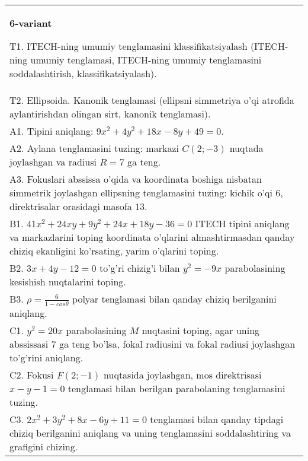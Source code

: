 \documentclass{article}
\begin{document}
\begin{tabular}{m{17cm}}
\textbf{6-variant}
\newline

T1. ITECH-ning umumiy tenglamasini klassifikatsiyalash (ITECH-ning umumiy tenglamasi, ITECH-ning umumiy tenglamasini soddalashtirish, klassifikatsiyalash).\\

T2. Ellipsoida. Kanonik tenglamasi (ellipsni simmetriya o'qi atrofida aylantirishdan olingan sirt, kanonik tenglamasi).\\

A1. Tipini aniqlang: $9x^{2}+4y^{2}+18x-8y+49=0$.\\

A2. Aylana tenglamasini tuzing: markazi $C(2;-3)$ nuqtada joylashgan va radiusi $R=7$ ga teng.\\

A3. Fokuslari abssissa o'qida va koordinata boshiga nisbatan simmetrik joylashgan ellipsning tenglamasini tuzing: kichik o'qi $6$, direktrisalar orasidagi masofa $13$.\\

B1. $41x^{2} + 24xy + 9y^{2} + 24x + 18y - 36 = 0$ ITECH tipini aniqlang va markazlarini toping koordinata o'qlarini almashtirmasdan qanday chiziq ekanligini ko'rsating, yarim o'qlarini toping.  \\

B2. $3x + 4y - 12 = 0$ to'g'ri chizig'i bilan $y^{2} = - 9x$ parabolasining kesishish nuqtalarini toping.  \\

B3. $\rho = \frac{6}{1 - cos\theta}$ polyar tenglamasi bilan qanday chiziq berilganini aniqlang.  \\

C1. $y^{2} = 20x$ parabolasining $M$ nuqtasini toping, agar uning abssissasi 7 ga teng bo'lsa, fokal radiusini va fokal radiusi joylashgan to'g'rini aniqlang.\\

C2. Fokusi $F(2; - 1)$ nuqtasida joylashgan, mos direktrisasi $x - y - 1 = 0$ tenglamasi bilan berilgan parabolaning tenglamasini tuzing.  \\

C3. $2x^{2} + 3y^{2} + 8x - 6y + 11 = 0$ tenglamasi bilan qanday tipdagi chiziq berilganini aniqlang va uning tenglamasini soddalashtiring va grafigini chizing.  \\

\end{tabular}
\vspace{1cm}
\end{document}
